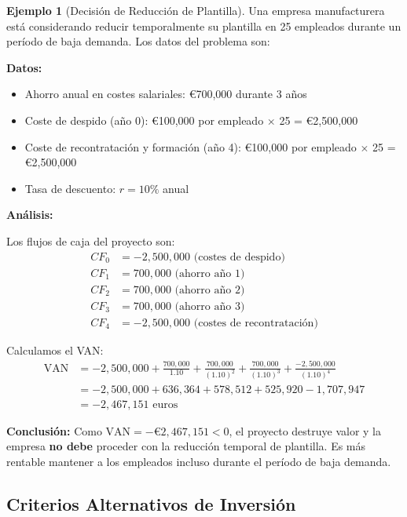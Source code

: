 \documentclass[12pt,a4paper]{article}
\theoremstyle{definition}
\newtheorem{ejemplo}{Ejemplo}[section]
\begin{document}
\begin{ejemplo}[Decisión de Reducción de Plantilla]
Una empresa manufacturera está considerando reducir temporalmente su plantilla en 25 empleados durante un período de baja demanda. Los datos del problema son:

\textbf{Datos:}
\begin{itemize}
\item Ahorro anual en costes salariales: €700,000 durante 3 años
\item Coste de despido (año 0): €100,000 por empleado $\times$ 25 = €2,500,000
\item Coste de recontratación y formación (año 4): €100,000 por empleado $\times$ 25 = €2,500,000
\item Tasa de descuento: $r = 10\%$ anual
\end{itemize}

\textbf{Análisis:}

Los flujos de caja del proyecto son:
\begin{align*}
CF_0 &= -2{,}500{,}000 \text{ (costes de despido)} \\
CF_1 &= 700{,}000 \text{ (ahorro año 1)} \\
CF_2 &= 700{,}000 \text{ (ahorro año 2)} \\
CF_3 &= 700{,}000 \text{ (ahorro año 3)} \\
CF_4 &= -2{,}500{,}000 \text{ (costes de recontratación)}
\end{align*}

Calculamos el VAN:
\begin{align*}
\text{VAN} &= -2{,}500{,}000 + \frac{700{,}000}{1.10} + \frac{700{,}000}{(1.10)^2} + \frac{700{,}000}{(1.10)^3} + \frac{-2{,}500{,}000}{(1.10)^4} \\
&= -2{,}500{,}000 + 636{,}364 + 578{,}512 + 525{,}920 - 1{,}707{,}947 \\
&= -2{,}467{,}151 \text{ euros}
\end{align*}

\textbf{Conclusión:} Como $\text{VAN} = -\text{€}2{,}467{,}151 < 0$, el proyecto destruye valor y la empresa \textbf{no debe} proceder con la reducción temporal de plantilla. Es más rentable mantener a los empleados incluso durante el período de baja demanda.
\end{ejemplo}

\subsection{Criterios Alternativos de Inversión}
\end{document}
